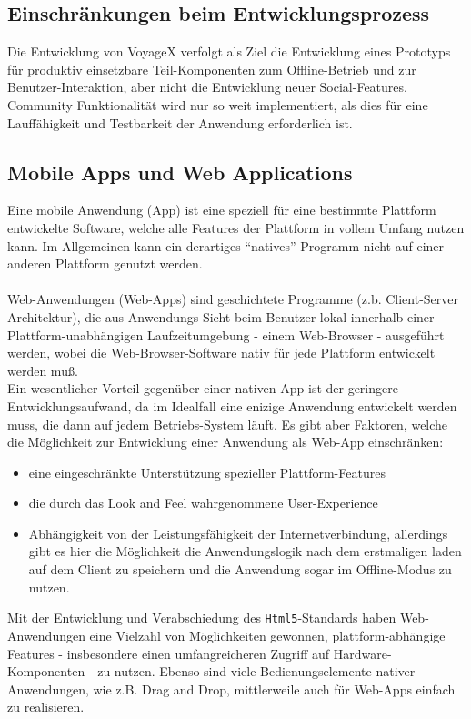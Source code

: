 \subsection{Einschränkungen beim Entwicklungsprozess}\label{4_ES}
Die Entwicklung von VoyageX verfolgt als Ziel die Entwicklung eines Prototyps für produktiv einsetzbare Teil-Komponenten zum Offline-Betrieb und zur Benutzer-Interaktion, aber nicht die Entwicklung neuer Social-Features. Community Funktionalität wird nur so weit implementiert, als dies für eine Lauffähigkeit und Testbarkeit der Anwendung erforderlich ist.


\subsection{Mobile Apps und Web Applications}\label{4_MAWA}
Eine mobile Anwendung (App) ist eine speziell für eine bestimmte Plattform entwickelte Software, welche
alle Features der Plattform in vollem Umfang nutzen kann. Im Allgemeinen kann ein derartiges "`natives"' Programm nicht auf einer anderen Plattform genutzt werden.\\ \\
Web-Anwendungen (Web-Apps) sind geschichtete Programme (z.b. Client-Server Architektur), die aus Anwendungs-Sicht beim Benutzer lokal innerhalb einer Plattform-unabhängigen Laufzeitumgebung - einem Web-Browser - ausgeführt werden, wobei die Web-Browser-Software nativ für jede Plattform entwickelt werden muß.\\
Ein wesentlicher Vorteil gegenüber einer nativen App ist der geringere Entwicklungsaufwand, da im Idealfall eine enizige Anwendung entwickelt werden muss, die dann auf jedem Betriebs-System läuft. Es gibt aber Faktoren, welche die Möglichkeit zur Entwicklung einer Anwendung als Web-App einschränken:
\begin{itemize}[leftmargin=*,noitemsep,topsep=1ex,parsep=0pt,partopsep=0pt]
\item eine eingeschränkte Unterstützung spezieller Plattform-Features
\item die durch das Look and Feel wahrgenommene User-Experience
\item Abhängigkeit von der Leistungsfähigkeit der Internetverbindung, allerdings gibt es hier die Möglichkeit die Anwendungslogik nach dem erstmaligen laden auf dem Client zu speichern und die Anwendung sogar im Offline-Modus zu nutzen.
\end{itemize}
Mit der Entwicklung und Verabschiedung des \texttt{Html5}-Standards haben Web-Anwendungen eine Vielzahl von Möglichkeiten gewonnen, plattform-abhängige Features - insbesondere einen umfangreicheren Zugriff auf Hardware-Komponenten - zu nutzen. Ebenso sind viele Bedienungselemente nativer Anwendungen, wie z.B. Drag and Drop, mittlerweile auch für Web-Apps einfach zu realisieren.

